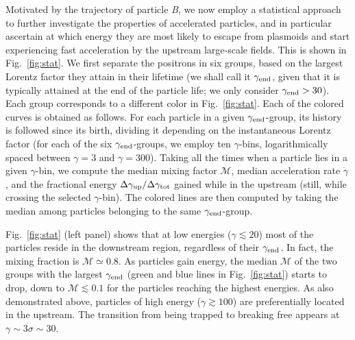 \documentclass[twocolumn,twocolappendix]{aastex63}
\begin{document}
Motivated by the trajectory of particle \emph{B}, we now employ a statistical approach to further investigate the properties of accelerated particles, and in particular ascertain at which energy they are most likely to escape from plasmoids and start experiencing fast acceleration by the upstream large-scale fields. This is shown in Fig.~\ref{fig:stat}. We first separate the positrons in six groups, based on the largest  Lorentz factor they attain in their lifetime (we shall call it $\gamma_{\rm end}$, given that it is typically attained at the end of the particle life; we only consider $\gamma_{\rm end}>30$). Each group corresponds to a different color in Fig.~\ref{fig:stat}. Each of the colored curves is obtained as follows. For each particle in a given $\gamma_{\rm end}$-group, its history is followed since its birth, dividing it depending on the instantaneous  Lorentz factor (for each of the six $\gamma_{\rm end}$-groups, we employ ten $\gamma$-bins, logarithmically spaced between $\gamma=3$ and $\gamma=300$). Taking all the times when a particle lies in a given $\gamma$-bin, we compute the median mixing factor $\mathcal{M}$, median acceleration rate $\dot{\gamma}$, and the fractional energy $\Delta \gamma_{\rm up}/\Delta \gamma_{\rm tot}$ gained while in the upstream (still, while crossing the selected $\gamma$-bin). The colored lines are then computed by taking the median among particles belonging to the same $\gamma_{\rm end}$-group.

Fig.~\ref{fig:stat} (left panel) shows that at low energies ($\gamma\lesssim 20$) most of the particles reside in the downstream region, regardless of their $\gamma_{\rm end}$. In fact, the mixing fraction is $\mathcal{M}\simeq 0.8$. As particles gain energy, the median $\mathcal{M}$ of the two groups with the largest $\gamma_{\rm end}$ (green and blue lines in Fig.~\ref{fig:stat}) starts to drop, down to $\mathcal{M}\lesssim 0.1$ for the particles reaching the highest energies. As also demonstrated above, particles of high energy ($\gamma\gtrsim 100$) are preferentially located in the upstream. The transition from being trapped to breaking free appears at $\gamma\sim  3\sigma\sim 30$.
\end{document}
